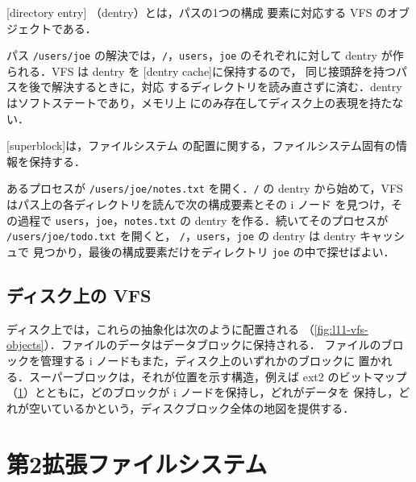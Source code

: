 \documentclass[../main.tex]{subfiles}
\begin{document}
\begin{definition}[ディレクトリエントリ]
  [directory entry]%
  （dentry）とは，パスの1つの構成
  要素に対応する VFS のオブジェクトである．
\end{definition}

パス \texttt{/users/joe} の解決では，\texttt{/}，\texttt{users}，\texttt{joe}
のそれぞれに対して dentry が作られる．VFS は dentry を
[dentry cache]に保持するので，
同じ接頭辞を持つパスを後で解決するときに，対応
するディレクトリを読み直さずに済む．dentry はソフトステートであり，メモリ上
にのみ存在してディスク上の表現を持たない．

\begin{definition}[スーパーブロック]
  [superblock]は，ファイルシステム
  の配置に関する，ファイルシステム固有の情報を保持する．
\end{definition}

\begin{example}
  あるプロセスが \texttt{/users/joe/notes.txt} を開く．\texttt{/} の dentry
  から始めて，VFS はパス上の各ディレクトリを読んで次の構成要素とその i ノード
  を見つけ，その過程で \texttt{users}，\texttt{joe}，\texttt{notes.txt} の
  dentry を作る．続いてそのプロセスが \texttt{/users/joe/todo.txt} を開くと，
  \texttt{/}，\texttt{users}，\texttt{joe} の dentry は dentry キャッシュで
  見つかり，最後の構成要素だけをディレクトリ \texttt{joe} の中で探せばよい．
\end{example}

\subsection{ディスク上の VFS}

ディスク上では，これらの抽象化は次のように配置される
（\cref{fig:l11-vfs-objects}）．ファイルのデータはデータブロックに保持される．
ファイルのブロックを管理する i ノードもまた，ディスク上のいずれかのブロックに
置かれる．スーパーブロックは，それが位置を示す構造，例えば ext2 のビットマップ
（\cref{sec:l11-ext2}）とともに，どのブロックが i ノードを保持し，どれがデータを
保持し，どれが空いているかという，ディスクブロック全体の地図を提供する．

\section{第2拡張ファイルシステム}
\label{sec:l11-ext2}
\end{document}
